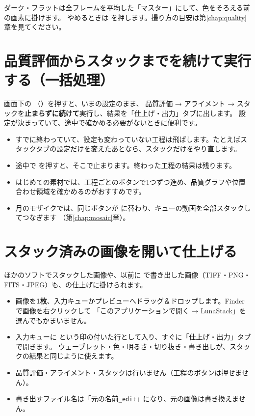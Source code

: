 ダーク・フラットは全フレームを平均した「マスター」にして、色をそろえる前の画素に掛けます。
やめるときは  を押します。撮り方の目安は第\ref{chap:quality}章を見てください。

\section{品質評価からスタックまでを続けて実行する（一括処理）}\label{sec:runall}

画面下の （）を押すと、いまの設定のまま、
品質評価 → アライメント → スタックを\textbf{止まらずに続けて}実行し、結果を「仕上げ・出力」タブに出します。
設定が決まっていて、途中で確かめる必要がないときに便利です。

\begin{itemize}[itemsep=2pt]
  \item すでに終わっていて、設定も変わっていない工程は飛ばします。たとえばスタックタブの設定だけを変えたあとなら、スタックだけをやり直します。
  \item 途中で  を押すと、そこで止まります。終わった工程の結果は残ります。
  \item はじめての素材では、工程ごとのボタンで1つずつ進め、品質グラフや位置合わせ領域を確かめるのがおすすめです。
  \item 月のモザイクでは、同じボタンが  に替わり、キューの動画を全部スタックしてつなぎます
        （第\ref{chap:mosaic}章）。
\end{itemize}

\section{スタック済みの画像を開いて仕上げる}\label{sec:open-image}

ほかのソフトでスタックした画像や、以前に \LS で書き出した画像（TIFF・PNG・FITS・JPEG）も、\LS の仕上げに掛けられます。

\begin{itemize}[itemsep=2pt]
  \item 画像を\textbf{1枚}、入力キューかプレビューへドラッグ＆ドロップします。Finder で画像を右クリックして
        「このアプリケーションで開く → LunaStack」を選んでもかまいません。
  \item 入力キューに  という印の付いた行として入り、すぐに「仕上げ・出力」タブで開きます。
        ウェーブレット・色・明るさ・切り抜き・書き出しが、スタックの結果と同じように使えます。
  \item 品質評価・アライメント・スタックは行いません（工程のボタンは押せません）。
  \item 書き出すファイル名は「元の名前\texttt{\_edit}」になり、元の画像は書き換えません。
\end{itemize}

